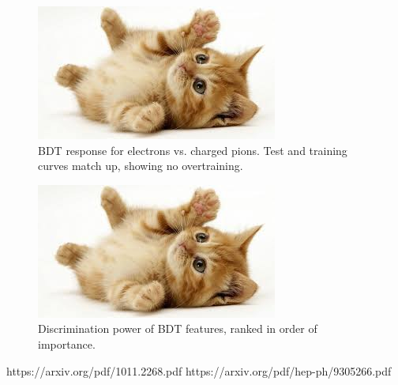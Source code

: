 \documentclass{article}
\begin{document}
    \begin{figure}
        \begin{center}
            \includegraphics{images/cat-thumb.jpeg}
        \end{center}
        \caption{BDT response for electrons vs. charged pions. Test and training curves match up, showing no overtraining.}
        \label{BDTdiscrimination_electron}
    \end{figure}

    \begin{figure}
        \begin{center}
            \includegraphics{images/cat-thumb.jpeg}
        \end{center}
        \caption{Discrimination power of BDT features, ranked in order of importance.}
        \label{BDTfeatures_electron}
    \end{figure}

    \clearpage
    \begin{thebibliography}{9}

         https://arxiv.org/pdf/1011.2268.pdf
         https://arxiv.org/pdf/hep-ph/9305266.pdf

    \end{thebibliography}
\end{document}
